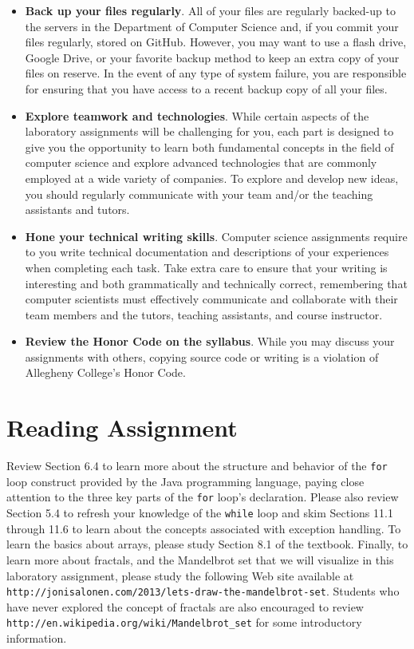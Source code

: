 \documentclass[11pt]{article}
\newcommand{\url}[1]{\lstinline{#1}}
\begin{document}
\begin{itemize}
\item {\bf Back up your files regularly}. All of your files are regularly backed-up to the servers in the Department of
  Computer Science and, if you commit your files regularly, stored on GitHub. However, you may want to use a flash
  drive, Google Drive, or your favorite backup method to keep an extra copy of your files on reserve. In the event of
  any type of system failure, you are responsible for ensuring that you have access to a recent backup copy of all your
  files.

\item {\bf Explore teamwork and technologies}. While certain aspects of the laboratory assignments will be challenging
  for you, each part is designed to give you the opportunity to learn both fundamental concepts in the field of computer
  science and explore advanced technologies that are commonly employed at a wide variety of companies. To explore and
  develop new ideas, you should regularly communicate with your team and/or the teaching assistants and tutors.

\item {\bf Hone your technical writing skills}. Computer science assignments require to you write technical
  documentation and descriptions of your experiences when completing each task. Take extra care to ensure that your
  writing is interesting and both grammatically and technically correct, remembering that computer scientists must
  effectively communicate and collaborate with their team members and the tutors, teaching assistants, and course
  instructor.

\item {\bf Review the Honor Code on the syllabus}. While you may discuss your assignments with others, copying source
  code or writing is a violation of Allegheny College's Honor Code.

\end{itemize}

\section*{Reading Assignment}

Review Section 6.4 to learn more about the structure and behavior of the {\tt for} loop construct provided by the Java
programming language, paying close attention to the three key parts of the {\tt for} loop's declaration. Please also
review Section 5.4 to refresh your knowledge of the {\tt while} loop and skim Sections 11.1 through 11.6 to learn about
the concepts associated with exception handling. To learn the basics about arrays, please study Section 8.1 of the
textbook. Finally, to learn more about fractals, and the Mandelbrot set that we will visualize in this laboratory
assignment, please study the following Web site available at
\url{http://jonisalonen.com/2013/lets-draw-the-mandelbrot-set}. Students who have never explored the concept of fractals
are also encouraged to review \url{http://en.wikipedia.org/wiki/Mandelbrot_set} for some introductory information.
\end{document}
